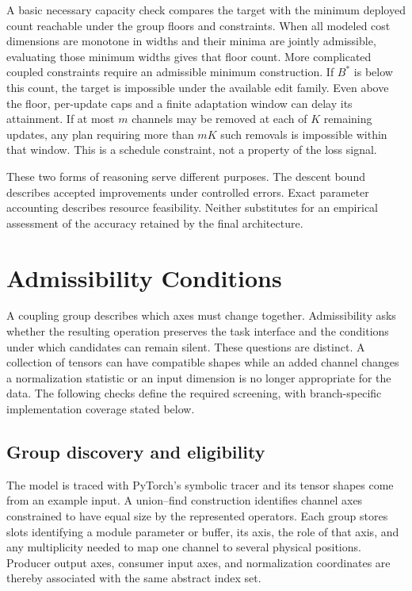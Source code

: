 \documentclass[10pt]{article}
\theoremstyle{paper}
\begin{document}
A basic necessary capacity check compares the target with the minimum deployed count reachable under the group floors and constraints. When all modeled cost dimensions are monotone in widths and their minima are jointly admissible, evaluating those minimum widths gives that floor count. More complicated coupled constraints require an admissible minimum construction. If $B^*$ is below this count, the target is impossible under the available edit family. Even above the floor, per-update caps and a finite adaptation window can delay its attainment. If at most $m$ channels may be removed at each of $K$ remaining updates, any plan requiring more than $mK$ such removals is impossible within that window. This is a schedule constraint, not a property of the loss signal.

These two forms of reasoning serve different purposes. The descent bound describes accepted improvements under controlled errors. Exact parameter accounting describes resource feasibility. Neither substitutes for an empirical assessment of the accuracy retained by the final architecture.
\section{Admissibility Conditions}
\label{app:admissibility}
A coupling group describes which axes must change together. Admissibility asks whether the resulting operation preserves the task interface and the conditions under which candidates can remain silent. These questions are distinct. A collection of tensors can have compatible shapes while an added channel changes a normalization statistic or an input dimension is no longer appropriate for the data. The following checks define the required screening, with branch-specific implementation coverage stated below.

\subsection{Group discovery and eligibility}
\label{app:eligibility}
The model is traced with PyTorch's symbolic tracer and its tensor shapes come from an example input. A union--find construction identifies channel axes constrained to have equal size by the represented operators. Each group stores slots identifying a module parameter or buffer, its axis, the role of that axis, and any multiplicity needed to map one channel to several physical positions. Producer output axes, consumer input axes, and normalization coordinates are thereby associated with the same abstract index set.
\end{document}
